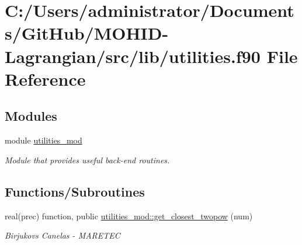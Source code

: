 \hypertarget{utilities_8f90}{}\section{C\+:/\+Users/administrator/\+Documents/\+Git\+Hub/\+M\+O\+H\+I\+D-\/\+Lagrangian/src/lib/utilities.f90 File Reference}
\label{utilities_8f90}
\subsection*{Modules}
\begin{DoxyCompactItemize}
\item 
module \hyperlink{namespaceutilities__mod}{utilities\+\_\+mod}
\begin{DoxyCompactList}\small\item\em Module that provides useful back-\/end routines. \end{DoxyCompactList}\end{DoxyCompactItemize}
\subsection*{Functions/\+Subroutines}
\begin{DoxyCompactItemize}
\item 
real(prec) function, public \hyperlink{namespaceutilities__mod_a683f93677348e11d331c1c37c66caf7a}{utilities\+\_\+mod\+::get\+\_\+closest\+\_\+twopow} (num)
\begin{DoxyCompactList}\small\item\em Birjukovs Canelas -\/ M\+A\+R\+E\+T\+EC \end{DoxyCompactList}\end{DoxyCompactItemize}
